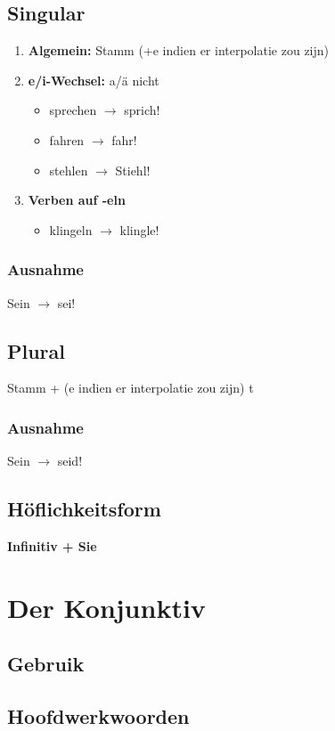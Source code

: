 \documentclass[main.tex]{subfiles}
\begin{document}
\subsection{Singular}
\begin{enumerate}
\item \textbf{Algemein:} Stamm (+e indien er interpolatie zou zijn)

\item \textbf{e/i-Wechsel:} a/ä nicht
	\begin{itemize}
	\item sprechen $\rightarrow$ sprich!
	\item fahren $\rightarrow$ fahr!
	\item stehlen $\rightarrow$ Stiehl!
	\end{itemize}

\item \textbf{Verben auf -eln}
	\begin{itemize}
	\item klingeln $\rightarrow$ klingle!
	\end{itemize}
\end{enumerate}
\subsubsection{Ausnahme}
Sein $\rightarrow$ sei!
\subsection{Plural}
Stamm + (e indien er interpolatie zou zijn) t
\subsubsection{Ausnahme}
Sein $\rightarrow$ seid!
\subsection{Höflichkeitsform}
\textbf{Infinitiv + Sie}

\section{Der Konjunktiv}
\subsection{Gebruik}
\subsection{Hoofdwerkwoorden}
\end{document}
